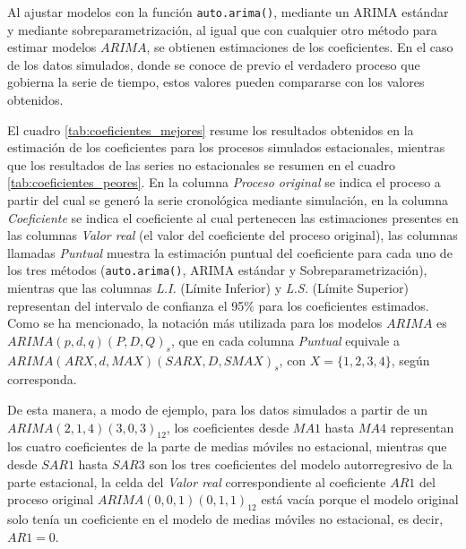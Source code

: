\documentclass[
]{article}
\begin{document}
Al ajustar modelos con la función \texttt{auto.arima()}, mediante un
ARIMA estándar y mediante sobreparametrización, al igual que con
cualquier otro método para estimar modelos \(ARIMA\), se obtienen
estimaciones de los coeficientes. En el caso de los datos simulados,
donde se conoce de previo el verdadero proceso que gobierna la serie de
tiempo, estos valores pueden compararse con los valores obtenidos.

El cuadro \ref{tab:coeficientes_mejores} resume los resultados obtenidos
en la estimación de los coeficientes para los procesos simulados
estacionales, mientras que los resultados de las series no estacionales
se resumen en el cuadro \ref{tab:coeficientes_peores}. En la columna
\emph{Proceso original} se indica el proceso a partir del cual se generó
la serie cronológica mediante simulación, en la columna
\emph{Coeficiente} se indica el coeficiente al cual pertenecen las
estimaciones presentes en las columnas \emph{Valor real} (el valor del
coeficiente del proceso original), las columnas llamadas \emph{Puntual}
muestra la estimación puntual del coeficiente para cada uno de los tres
métodos (\texttt{auto.arima()}, ARIMA estándar y Sobreparametrización),
mientras que las columnas \emph{L.I.} (Límite Inferior) y \emph{L.S.}
(Límite Superior) representan del intervalo de confianza el 95\% para
los coeficientes estimados. Como se ha mencionado, la notación más
utilizada para los modelos \(ARIMA\) es \(ARIMA(p,d,q)(P,D,Q)_s\), que
en cada columna \emph{Puntual} equivale a
\(ARIMA(ARX, d, MAX)(SARX, D, SMAX)_s\), con \(X=\{1,2,3,4\}\), según
corresponda.

De esta manera, a modo de ejemplo, para los datos simulados a partir de
un \(ARIMA(2,1,4)(3,0,3)_{12}\), los coeficientes desde \(MA1\) hasta
\(MA4\) representan los cuatro coeficientes de la parte de medias
móviles no estacional, mientras que desde \(SAR1\) hasta \(SAR3\) son
los tres coeficientes del modelo autorregresivo de la parte estacional,
la celda del \emph{Valor real} correspondiente al coeficiente \(AR1\)
del proceso original \(ARIMA(0,0,1)(0,1,1)_{12}\) está vacía porque el
modelo original solo tenía un coeficiente en el modelo de medias móviles
no estacional, es decir, \(AR1=0\).
\end{document}
